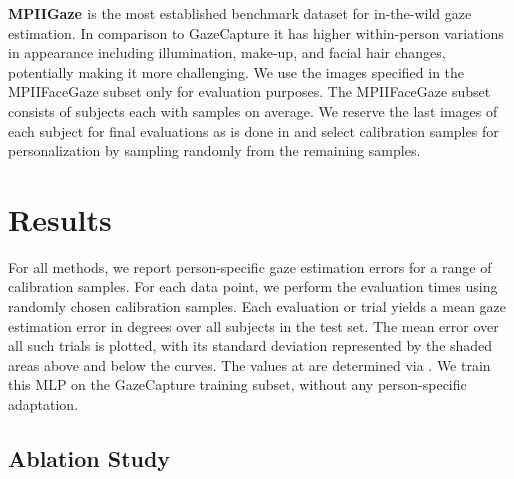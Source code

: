 \documentclass[10pt,twocolumn,letterpaper]{article}
\newcommand{\Paragraph}[1]
{\vspace{1.5mm} \noindent \textbf{#1}}
\begin{document}
\Paragraph{MPIIGaze \cite{Zhang2015CVPR}} is the most established benchmark dataset for in-the-wild gaze estimation. In comparison to GazeCapture it has higher within-person variations in appearance including illumination, make-up, and facial hair changes, potentially making it more challenging.
We use the images specified in the MPIIFaceGaze subset \cite{Zhang2017CVPRW} only for evaluation purposes. The MPIIFaceGaze subset consists of  subjects each with  samples on average. We reserve the last  images of each subject for final evaluations as is done in \cite{Zhang2019TPAMI} and select  calibration samples for personalization by sampling randomly from the remaining samples. 
 
\section{Results}

For all methods, we report person-specific gaze estimation errors for a range of  calibration samples.
For each data point, we perform the evaluation  times using  randomly chosen calibration samples. 
Each evaluation or trial yields a mean gaze estimation error in degrees over all subjects in the test set.
The mean error over all such trials is plotted, with its standard deviation represented by the shaded areas above and below the curves.
The values at  are determined via . 
We train this MLP on the GazeCapture training subset, without any person-specific adaptation.

\subsection{Ablation Study}
\label{sec:ablation}
\end{document}
